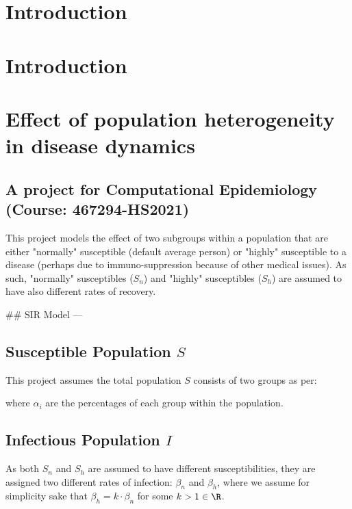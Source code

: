\begin{multicols}{3}

\section{Introduction}

\section{Introduction}

\section{Effect of population heterogeneity in disease dynamics}
\subsection{A project for Computational Epidemiology (Course: 467294-HS2021)}

This project models the effect of two subgroups within a population that are either "normally" susceptible (default average person) or "highly" susceptible to a disease (perhaps due to immuno-suppression because of other medical issues). As such, "normally" susceptibles ($S_n$) and "highly" susceptibles ($S_h$) are assumed to have also different rates of recovery.

## SIR Model 
---
\subsection{Susceptible Population $S$}
This project assumes the total population $S$ consists of two groups as per:

%	
%

where $\alpha_i$ are the percentages of each group within the population. 

\subsection{Infectious Population $I$}
As both $S_n$ and $S_h$ are assumed to have different susceptibilities, they are assigned two different rates of infection: $\beta_n$ and $\beta_h$, where we assume for simplicity sake that $\beta_h = k\cdot\beta_n$ for some $k > 1 \in \R$. 





\end{multicols}
